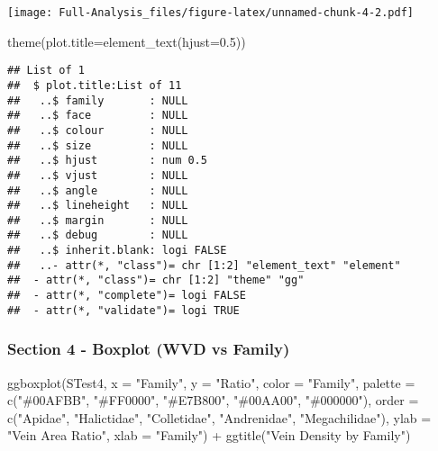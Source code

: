 \documentclass[
]{article}
\newenvironment{Shaded}{\begin{snugshade}}{\end{snugshade}}
\newcommand{\AttributeTok}[1]{\textcolor[rgb]{0.77,0.63,0.00}{#1}}
\newcommand{\FloatTok}[1]{\textcolor[rgb]{0.00,0.00,0.81}{#1}}
\newcommand{\FunctionTok}[1]{\textcolor[rgb]{0.00,0.00,0.00}{#1}}
\newcommand{\NormalTok}[1]{#1}
\newcommand{\SpecialCharTok}[1]{\textcolor[rgb]{0.00,0.00,0.00}{#1}}
\newcommand{\StringTok}[1]{\textcolor[rgb]{0.31,0.60,0.02}{#1}}
\begin{document}
\texttt{[image: Full-Analysis\_files/figure-latex/unnamed-chunk-4-2.pdf]}

\begin{Shaded}
\begin{Highlighting}[]
  \FunctionTok{theme}\NormalTok{(}\AttributeTok{plot.title=}\FunctionTok{element\_text}\NormalTok{(}\AttributeTok{hjust=}\FloatTok{0.5}\NormalTok{))}
\end{Highlighting}
\end{Shaded}

\begin{verbatim}
## List of 1
##  $ plot.title:List of 11
##   ..$ family       : NULL
##   ..$ face         : NULL
##   ..$ colour       : NULL
##   ..$ size         : NULL
##   ..$ hjust        : num 0.5
##   ..$ vjust        : NULL
##   ..$ angle        : NULL
##   ..$ lineheight   : NULL
##   ..$ margin       : NULL
##   ..$ debug        : NULL
##   ..$ inherit.blank: logi FALSE
##   ..- attr(*, "class")= chr [1:2] "element_text" "element"
##  - attr(*, "class")= chr [1:2] "theme" "gg"
##  - attr(*, "complete")= logi FALSE
##  - attr(*, "validate")= logi TRUE
\end{verbatim}

\hypertarget{section-4---boxplot-wvd-vs-family}{%
\subsubsection{Section 4 - Boxplot (WVD vs
Family)}\label{section-4---boxplot-wvd-vs-family}}

\begin{Shaded}
\begin{Highlighting}[]
\FunctionTok{ggboxplot}\NormalTok{(STest4, }\AttributeTok{x =} \StringTok{"Family"}\NormalTok{, }\AttributeTok{y =} \StringTok{"Ratio"}\NormalTok{, }
          \AttributeTok{color =} \StringTok{"Family"}\NormalTok{, }\AttributeTok{palette =} \FunctionTok{c}\NormalTok{(}\StringTok{"\#00AFBB"}\NormalTok{, }\StringTok{"\#FF0000"}\NormalTok{, }\StringTok{"\#E7B800"}\NormalTok{, }\StringTok{"\#00AA00"}\NormalTok{, }\StringTok{"\#000000"}\NormalTok{),}
          \AttributeTok{order =} \FunctionTok{c}\NormalTok{(}\StringTok{"Apidae"}\NormalTok{, }\StringTok{"Halictidae"}\NormalTok{, }\StringTok{"Colletidae"}\NormalTok{, }\StringTok{"Andrenidae"}\NormalTok{, }\StringTok{"Megachilidae"}\NormalTok{),}
          \AttributeTok{ylab =} \StringTok{"Vein Area Ratio"}\NormalTok{, }\AttributeTok{xlab =} \StringTok{"Family"}\NormalTok{) }\SpecialCharTok{+}
          \FunctionTok{ggtitle}\NormalTok{(}\StringTok{"Vein Density by Family"}\NormalTok{)}
\end{Highlighting}
\end{Shaded}
\end{document}

